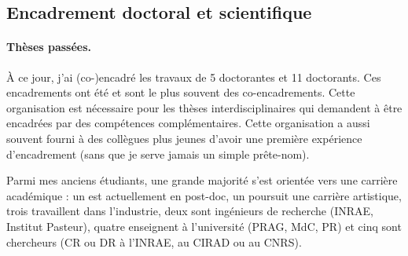 \subsection{Encadrement doctoral et scientifique}

\paragraph{Thèses passées.}
À ce jour, j'ai (co-)encadré les travaux de 5 doctorantes et 11 doctorants.
Ces encadrements ont été et sont le plus souvent des co-encadrements. 
Cette organisation est nécessaire pour les thèses interdisciplinaires qui demandent à être encadrées par des compétences complémentaires. 
Cette organisation a aussi souvent fourni à des collègues plus jeunes d’avoir une première expérience d’encadrement (sans que je serve jamais un simple prête-nom). 

Parmi mes anciens étudiants, une grande majorité s’est orientée vers une carrière académique : un est actuellement en post-doc, un poursuit une carrière artistique, trois travaillent dans l’industrie, deux sont ingénieurs de recherche (INRAE, Institut Pasteur), quatre enseignent à l’université (PRAG, MdC, PR) et cinq sont chercheurs (CR ou DR à l’INRAE, au CIRAD ou au CNRS). 

